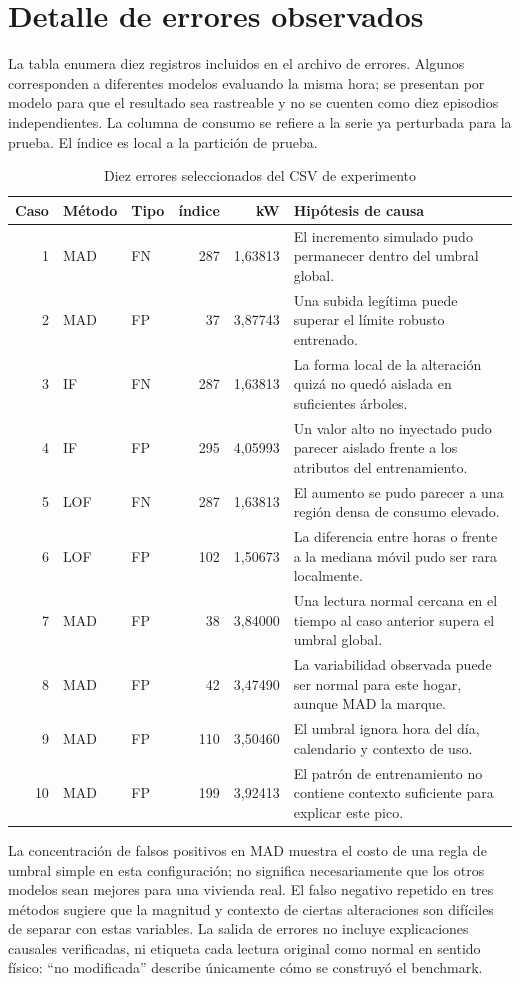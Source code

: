 \documentclass[10pt,twocolumn]{article}
\begin{document}
\section{Detalle de errores observados}
La tabla enumera diez registros incluidos en el archivo de errores. Algunos corresponden a diferentes modelos evaluando la misma hora; se presentan por modelo para que el resultado sea rastreable y no se cuenten como diez episodios independientes. La columna de consumo se refiere a la serie ya perturbada para la prueba. El índice es local a la partición de prueba.
\begin{table}[t]
\centering\scriptsize
\caption{Diez errores seleccionados del CSV de experimento}
\begin{tabular}{rllrrp{7.7cm}}
\hline
Caso & Método & Tipo & índice & kW & Hipótesis de causa\\\hline
1 & MAD & FN & 287 & 1,63813 & El incremento simulado pudo permanecer dentro del umbral global.\\
2 & MAD & FP & 37 & 3,87743 & Una subida legítima puede superar el límite robusto entrenado.\\
3 & IF & FN & 287 & 1,63813 & La forma local de la alteración quizá no quedó aislada en suficientes árboles.\\
4 & IF & FP & 295 & 4,05993 & Un valor alto no inyectado pudo parecer aislado frente a los atributos del entrenamiento.\\
5 & LOF & FN & 287 & 1,63813 & El aumento se pudo parecer a una región densa de consumo elevado.\\
6 & LOF & FP & 102 & 1,50673 & La diferencia entre horas o frente a la mediana móvil pudo ser rara localmente.\\
7 & MAD & FP & 38 & 3,84000 & Una lectura normal cercana en el tiempo al caso anterior supera el umbral global.\\
8 & MAD & FP & 42 & 3,47490 & La variabilidad observada puede ser normal para este hogar, aunque MAD la marque.\\
9 & MAD & FP & 110 & 3,50460 & El umbral ignora hora del día, calendario y contexto de uso.\\
10 & MAD & FP & 199 & 3,92413 & El patrón de entrenamiento no contiene contexto suficiente para explicar este pico.\\\hline
\end{tabular}
\end{table}

La concentración de falsos positivos en MAD muestra el costo de una regla de umbral simple en esta configuración; no significa necesariamente que los otros modelos sean mejores para una vivienda real. El falso negativo repetido en tres métodos sugiere que la magnitud y contexto de ciertas alteraciones son difíciles de separar con estas variables. La salida de errores no incluye explicaciones causales verificadas, ni etiqueta cada lectura original como normal en sentido físico: “no modificada” describe únicamente cómo se construyó el benchmark.
\end{document}
